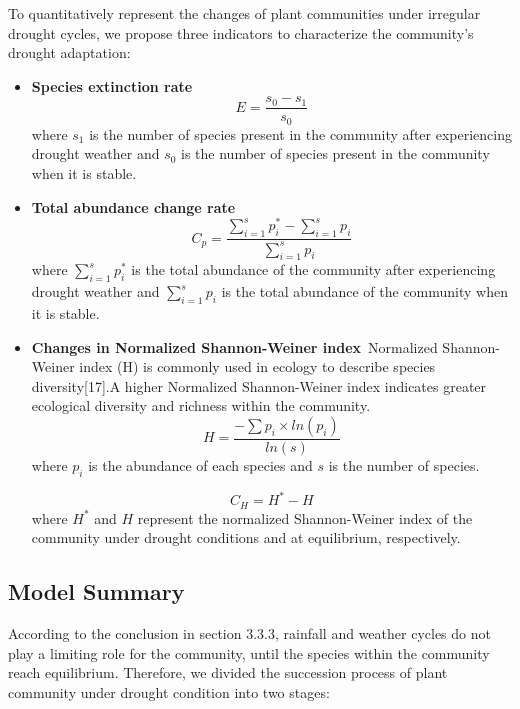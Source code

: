 \documentclass{mcmthesis}
\begin{document}
To quantitatively represent the changes of plant communities under irregular drought cycles, we propose three indicators to characterize the community's drought adaptation:

\begin{itemize}
	\item \textbf{Species extinction rate}\,
	\begin{equation}
		E = \frac{s_0-s_1}{s_0}
	\end{equation}
	where $s_1$ is the number of species present in the community after experiencing drought weather and $s_0$ is the number of species present in the community when it is stable.
	
	\item \textbf{Total abundance change rate}\,
	\begin{equation}
		C_p = \frac{\sum_{i=1}^{s}{p_i^*}-\sum_{i=1}^{s}{p_i}}{\sum_{i=1}^{s}{p_i}} 
	\end{equation}
	where $\sum_{i=1}^{s}{p_i^*}$ is the total abundance of the community after experiencing drought weather and $\sum_{i=1}^{s}{p_i}$ is the total abundance of the community when it is stable.
	
	\item \textbf{Changes in Normalized Shannon-Weiner index}\,
	Normalized Shannon-Weiner index (H) is commonly used in ecology to describe species diversity[17].A higher Normalized Shannon-Weiner index indicates greater ecological diversity and richness within the community.
	\begin{equation}
		H=\frac{-\sum{p_i\times ln(p_i)}}{ln(s)}
	\end{equation}
	where $p_i$ is the abundance of each species and $s$ is the number of species.
	
	\begin{equation}
		C_H = H^*-H
	\end{equation}
	where $H^*$ and $H$ represent the normalized Shannon-Weiner index of the community under drought conditions and at equilibrium, respectively.
	
\end{itemize}

\subsection{Model Summary}

According to the conclusion in section 3.3.3, rainfall and weather cycles do not play a limiting role for the community, until the species within the community reach equilibrium. Therefore, we divided the succession process of plant community under drought condition into two stages:
\end{document}
